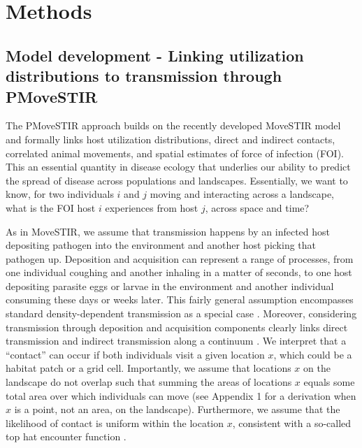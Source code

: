 \documentclass[letterpaper]{article}
\begin{document}
\section*{Methods}

\subsection*{Model development - Linking utilization distributions to transmission through PMoveSTIR}

The PMoveSTIR approach builds on the recently developed MoveSTIR model \citep{Wilber2022} and formally links host utilization distributions, direct and indirect contacts, correlated animal movements, and spatial estimates of force of infection (FOI). This an essential quantity in disease ecology that underlies our ability to predict the spread of disease across populations and landscapes. Essentially, we want to know, for two individuals $i$ and $j$ moving and interacting across a landscape, what is the FOI host $i$ experiences from host $j$, across space and time?  

As in MoveSTIR, we assume that transmission happens by an infected host depositing pathogen into the environment and another host picking that pathogen up. 
Deposition and acquisition can represent a range of processes, from one individual coughing and another inhaling in a matter of seconds, to one host depositing parasite eggs or larvae in the environment and another individual consuming these  days or weeks later. 
This fairly general assumption encompasses standard density-dependent transmission as a special case \citep{Cortez2021}. 
Moreover, considering transmission through deposition and acquisition components clearly links direct transmission and indirect transmission along a continuum \citep{Wilber2022}.
We interpret that a ``contact'' can occur if both individuals visit a given location $x$, which could be a habitat patch or a grid cell. 
Importantly, we assume that locations $x$ on the landscape do not overlap such that summing the areas of locations $x$ equals some total area over which individuals can move (see Appendix 1 for a derivation when $x$ is a point, not an area, on the landscape). 
Furthermore, we assume that the likelihood of contact is uniform within the location $x$, consistent with a so-called top hat encounter function \citep{Gurarie2013,Wilber2022}.
\end{document}
